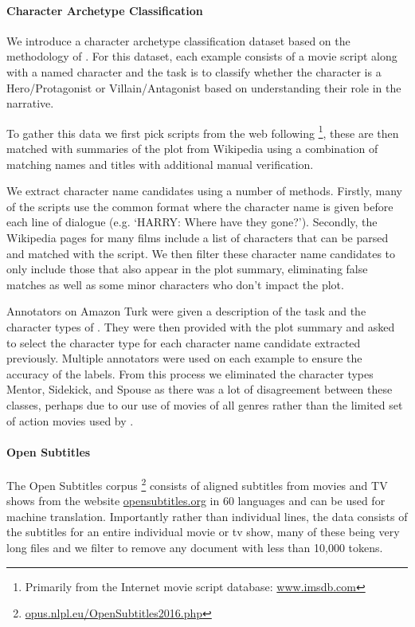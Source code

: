 \documentclass[10pt, a4paper]{article}
\begin{document}
\paragraph{Character Archetype Classification} We introduce a character archetype classification dataset based on the methodology of . For this dataset, each example consists of a movie script along with a named character and the task is to classify whether the character is a Hero/Protagonist or Villain/Antagonist based on understanding their role in the narrative.

To gather this data we first pick scripts from the web following \footnote{Primarily from the Internet movie script database: \url{www.imsdb.com}}, these are then matched with summaries of the plot from Wikipedia using a combination of matching names and titles with additional manual verification.

We extract character name candidates using a number of methods. Firstly, many of the scripts use the common format where the character name is given before each line of dialogue (e.g. `HARRY: Where have they gone?'). Secondly, the Wikipedia pages for many films include a list of characters that can be parsed and matched with the script. We then filter these character name candidates to only include those that also appear in the plot summary, eliminating false matches as well as some minor characters who don't impact the plot.

Annotators on Amazon Turk were given a description of the task and the character types of . They were then provided with the plot summary and asked to select the character type for each character name candidate extracted previously. Multiple annotators were used on each example to ensure the accuracy of the labels. From this process we eliminated the character types Mentor, Sidekick, and Spouse as there was a lot of disagreement between these classes, perhaps due to our use of movies of all genres rather than the limited set of action movies used by . 

\paragraph{Open Subtitles}
The Open Subtitles corpus \cite{Lison_2018OpenSubtitles}\footnote{\url{opus.nlpl.eu/OpenSubtitles2016.php}} consists of aligned subtitles from movies and TV shows from the website \url{opensubtitles.org} in 60 languages and can be used for machine translation. Importantly rather than individual lines, the data consists of the subtitles for an entire individual movie or tv show, many of these being very long files and we filter to remove any document with less than 10,000 tokens. 
\end{document}
